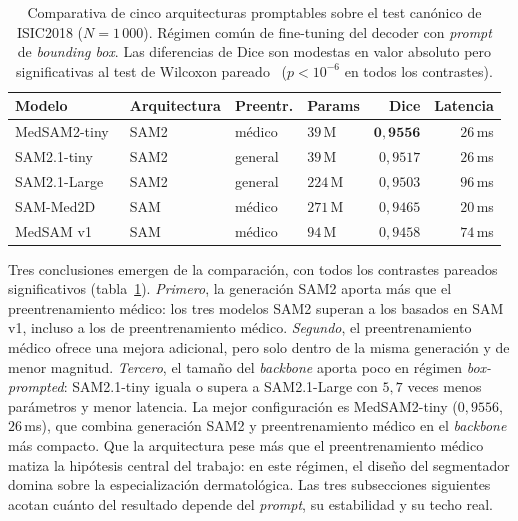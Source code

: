 \begin{table}[htbp]
\centering
\footnotesize
\setlength{\tabcolsep}{4pt}
\renewcommand{\arraystretch}{0.95}
\caption{Comparativa de cinco arquitecturas promptables sobre el
test canónico de ISIC2018 ($N = 1\,000$). Régimen común de
fine-tuning del decoder con \emph{prompt} de
\emph{bounding box}. Las diferencias de Dice son modestas en valor
absoluto pero significativas al test de Wilcoxon
pareado~\cite{wilcoxon1945}
($p < 10^{-6}$ en todos los contrastes).}
\label{tab:seg-arquitecturas}
\begin{tabular}{llllrr}
\hline
Modelo            & Arquitectura       & Preentr. & Params & Dice & Latencia \\
\hline
MedSAM2-tiny~\cite{medsam2} & SAM2~\cite{sam2}   & médico   & $39$\,M  & $\mathbf{0{,}9556}$ & $26$\,ms \\
SAM2.1-tiny       & SAM2~\cite{sam2}   & general  & $39$\,M  & $0{,}9517$ & $26$\,ms \\
SAM2.1-Large      & SAM2~\cite{sam2}   & general  & $224$\,M & $0{,}9503$ & $96$\,ms \\
SAM-Med2D~\cite{sammed2d} & SAM~\cite{sam2023} & médico   & $271$\,M & $0{,}9465$ & $20$\,ms \\
MedSAM v1~\cite{medsam}   & SAM~\cite{sam2023} & médico   & $94$\,M  & $0{,}9458$ & $74$\,ms \\
\hline
\end{tabular}
\end{table}

Tres conclusiones emergen de la comparación, con todos los contrastes
pareados significativos (tabla~\ref{tab:seg-arquitecturas}).
\textit{Primero}, la generación
SAM2 aporta más que el preentrenamiento médico: los tres modelos SAM2
superan a los basados en SAM v1, incluso a los de preentrenamiento
médico. \textit{Segundo}, el preentrenamiento médico ofrece una mejora
adicional, pero solo dentro de la misma generación y de menor
magnitud. \textit{Tercero}, el tamaño del \emph{backbone} aporta poco
en régimen \emph{box-prompted}: SAM2.1-tiny iguala o supera a
SAM2.1-Large con $5{,}7$ veces menos parámetros y menor latencia. La
mejor configuración es MedSAM2-tiny ($0{,}9556$, $26$\,ms), que
combina generación SAM2 y preentrenamiento médico en el
\emph{backbone} más compacto. Que la arquitectura pese más que el
preentrenamiento médico matiza la hipótesis central del trabajo: en
este régimen, el diseño del segmentador domina sobre la
especialización dermatológica. Las tres subsecciones siguientes acotan
cuánto del resultado depende del \emph{prompt}, su estabilidad y su
techo real.

